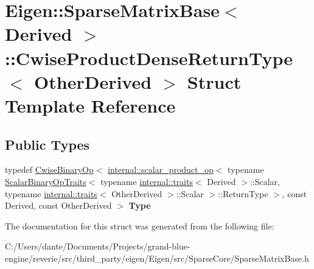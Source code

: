 \hypertarget{struct_eigen_1_1_sparse_matrix_base_1_1_cwise_product_dense_return_type}{}\section{Eigen\+::Sparse\+Matrix\+Base$<$ Derived $>$\+::Cwise\+Product\+Dense\+Return\+Type$<$ Other\+Derived $>$ Struct Template Reference}
\label{struct_eigen_1_1_sparse_matrix_base_1_1_cwise_product_dense_return_type}
\subsection*{Public Types}
\begin{DoxyCompactItemize}
\item 
\mbox{\label{struct_eigen_1_1_sparse_matrix_base_1_1_cwise_product_dense_return_type_a0c5232f6ca39d1d0c0af44389a87916e}} 
typedef \mbox{\hyperlink{class_eigen_1_1_cwise_binary_op}{Cwise\+Binary\+Op}}$<$ \mbox{\hyperlink{struct_eigen_1_1internal_1_1scalar__product__op}{internal\+::scalar\+\_\+product\+\_\+op}}$<$ typename \mbox{\hyperlink{struct_eigen_1_1_scalar_binary_op_traits}{Scalar\+Binary\+Op\+Traits}}$<$ typename \mbox{\hyperlink{struct_eigen_1_1internal_1_1traits}{internal\+::traits}}$<$ Derived $>$\+::Scalar, typename \mbox{\hyperlink{struct_eigen_1_1internal_1_1traits}{internal\+::traits}}$<$ Other\+Derived $>$\+::Scalar $>$\+::Return\+Type $>$, const Derived, const Other\+Derived $>$ {\bfseries Type}
\end{DoxyCompactItemize}


The documentation for this struct was generated from the following file\+:\begin{DoxyCompactItemize}
\item 
C\+:/\+Users/dante/\+Documents/\+Projects/grand-\/blue-\/engine/reverie/src/third\+\_\+party/eigen/\+Eigen/src/\+Sparse\+Core/Sparse\+Matrix\+Base.\+h\end{DoxyCompactItemize}
